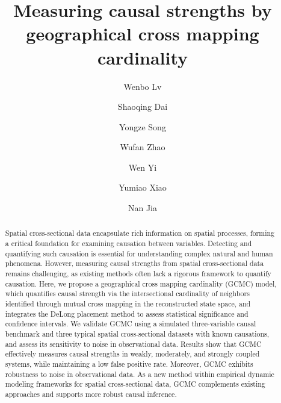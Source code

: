 \documentclass[authoryear,preprint,review,12pt]{elsarticle}
\begin{document}
\begin{frontmatter}
\title{Measuring causal strengths by geographical cross mapping cardinality}

\author[a,b,c]{Wenbo Lv}

\author[d]{Shaoqing Dai}

\author[e]{Yongze Song}

\author[a]{Wufan Zhao}

\author[b]{Wen Yi}

\author[a]{Yumiao Xiao}

\author[f,g]{Nan Jia}

\address[a]{Urban Governance and Design Thrust, Society Hub, The Hong Kong University of Science and Technology(Guangzhou), Guangzhou, China}
\address[b]{Department of Building and Real Estate, The Hong Kong Polytechnic University, Hong Kong, China}
\address[c]{The Hong Kong Polytechnic University, Shenzhen Research Institute, Shenzhen, China}
\address[d]{School of Resource and Environmental Sciences, Wuhan University, Wuhan, China}
\address[e]{School of Design and the Built Environment, Curtin University, Perth, Australia}
\address[f]{Department of Fisheries and Wildlife, Michigan State University, East Lansing, USA}
\address[g]{School of Design, Shanghai Jiao Tong Univeristy, Shanghai, China}


\begin{abstract}


Spatial cross-sectional data encapsulate rich information on spatial processes, forming a critical foundation for examining causation between variables. Detecting and quantifying such causation is essential for understanding complex natural and human phenomena. However, measuring causal strengths from spatial cross-sectional data remains challenging, as existing methods often lack a rigorous framework to quantify causation. Here, we propose a geographical cross mapping cardinality (GCMC) model, which quantifies causal strength via the intersectional cardinality of neighbors identified through mutual cross mapping in the reconstructed state space, and integrates the DeLong placement method to assess statistical significance and confidence intervals. We validate GCMC using a simulated three-variable causal benchmark and three typical spatial cross-sectional datasets with known causations, and assess its sensitivity to noise in observational data. Results show that GCMC effectively measures causal strengths in weakly, moderately, and strongly coupled systems, while maintaining a low false positive rate. Moreover, GCMC exhibits robustness to noise in observational data. As a new method within empirical dynamic modeling frameworks for spatial cross-sectional data, GCMC complements existing approaches and supports more robust causal inference.



\end{abstract}
\end{frontmatter}
\end{document}
